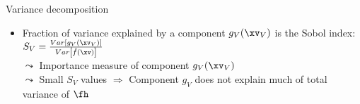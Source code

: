 \documentclass[11pt,compress,t,notes=noshow, aspectratio=169, xcolor=table]{beamer}
\newcommand{\open}{}
\newcommand{\close}{}
\begin{document}
\begin{frame}{Variance decomposition}
\begin{itemize}[<+->]
\item Fraction of variance explained by a component $g_{\open V \close}(\xv_V)$ is the Sobol index:
$
S_V = \frac{Var\left[g_{\open V \close}(\xv_V)\right]}{Var\left[\hat{f}(\xv)\right]}
$\\
$\leadsto$ Importance measure of component $g_{\open V \close}(\xv_V)$\\
$\leadsto$ Small $S_V$ values $\Rightarrow$ Component $g_{\open V \close}$ does not explain much of total variance of $\fh$
\end{itemize}

\end{frame}


\endlecture
\end{document}
